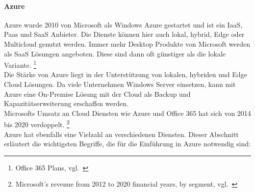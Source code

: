 \paragraph{Azure}\label{caas_tools_azure}

Azure wurde 2010 von Microsoft als Windows Azure gestartet und ist ein IaaS, Paas und SaaS Anbieter.
Die Dienste können hier auch lokal, hybrid, Edge oder Multicloud genutzt werden.
Immer mehr Desktop Produkte von Microsoft werden als SaaS Lösungen angeboten.
Diese sind dann oft günstiger als die lokale Variante.
\footnote{{Office 365 Plans, vgl.~\cite{AZURE_OFFICE_PLANS}}} \\

Die Stärke von Azure liegt in der Unterstützung von lokalen, hybriden und Edge Cloud Lösungen.
Da viele Unternehmen Windows Server einsetzen, kann mit Azure eine On-Premise Lösung mit der Cloud als Backup und Kapazitätserweiterung erschaffen werden. \\

Microsofts Umsatz an Cloud Diensten wie Azure und Office 365 hat sich von 2014 bis 2020 verdoppelt.
\footnote{{Microsoft's revenue from 2012 to 2020 financial years, by segment, vgl.~\cite{AZURE_REVENUE}}} \\


Azure hat ebenfalls eine Vielzahl an verschiedenen Diensten.
Dieser Abschnitt erläutert die wichtigsten Begriffe, die für die Einführung in Azure notwendig sind:

